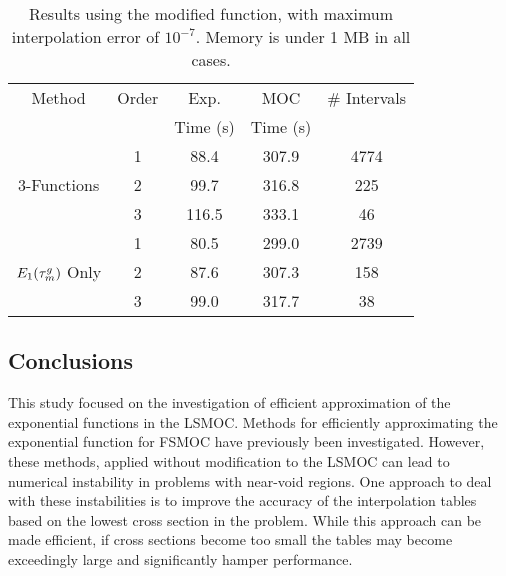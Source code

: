 {{{{        \begin{table}
          \centering
          \caption{Results using the modified function, with maximum interpolation error of $10^{-7}$. Memory is under 1 MB in all cases.}
          \label{tab:LSMOC:ET:Final Results}
          \begin{tabular}{@{}ccccc@{}}\toprule
            Method & Order & Exp.     & \ac{MOC}& \# Intervals \\
                   &       & Time (s) & Time (s) & \\\midrule
            \multirow{3}{*}{3-Functions}      & 1 &  88.4 & 307.9 & 4774\\
                                              & 2 &  99.7 & 316.8 &  225\\
                                              & 3 & 116.5 & 333.1 &   46\\\midrule
            \multirow{3}{*}{$E_1(\opt)$ Only} & 1 &  80.5 & 299.0 & 2739\\
                                              & 2 &  87.6 & 307.3 &  158\\
                                              & 3 &  99.0 & 317.7 &   38\\\bottomrule
          \end{tabular}
        \end{table}
      }
    }
    \subsection{Conclusions}{\label{ssec:LSMOC:ET:Conclusions}
      This study focused on the investigation of efficient approximation of the exponential functions in the \ac{LSMOC}.
      Methods for efficiently approximating the exponential function for \ac{FSMOC} have previously been investigated.
      However, these methods, applied without modification to the \ac{LSMOC} can lead to numerical instability in problems with near-void regions.
      One approach to deal with these instabilities is to improve the accuracy of the interpolation tables based on the lowest cross section in the problem.
      While this approach can be made efficient, if cross sections become too small the tables may become exceedingly large and significantly hamper performance.

}}}
